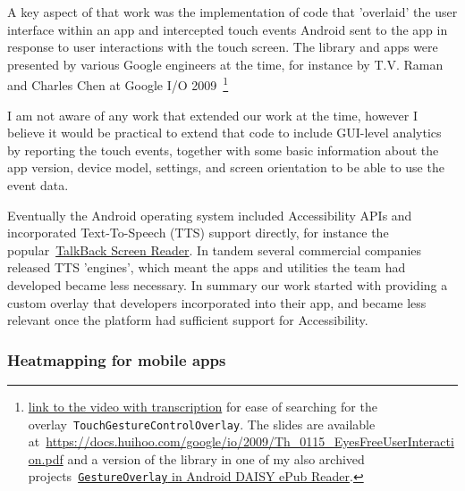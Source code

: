 A key aspect of that work was the implementation of code that 'overlaid' the user interface within an app and intercepted touch events Android sent to the app in response to user interactions with the touch screen. The library and apps were presented by various Google engineers at the time, for instance by T.V. Raman and Charles Chen at Google I/O 2009~\footnote{ \href{http://transcriptvids.com/v/xS-ju61vOQw.html}{link to the video with transcription} for ease of searching for the overlay~\texttt{TouchGestureControlOverlay}. The slides are available at~\url{https://docs.huihoo.com/google/io/2009/Th_0115_EyesFreeUserInteraction.pdf} and a version of the library in one of my also archived projects~\href{https://github.com/julianharty/android-daisy-epub-reader/blob/master/src/com/google/marvin/widget/GestureOverlay.java}{\texttt{GestureOverlay} in Android DAISY ePub Reader}.} 

I am not aware of any work that extended our work at the time, however I believe it would be practical to extend that code to include GUI-level analytics by reporting the touch events, together with some basic information about the app version, device model, settings, and screen orientation to be able to use the event data.

Eventually the Android operating system included Accessibility APIs and incorporated Text-To-Speech (TTS) support directly, for instance the popular~\href{https://support.google.com/accessibility/android/answer/6283677?hl=en}{TalkBack Screen Reader}. In tandem several commercial companies released TTS 'engines', which meant the apps and utilities the team had developed became less necessary. In summary our work started with providing a custom overlay that developers incorporated into their app, and became less relevant once the platform had sufficient support for Accessibility.


\subsubsection{Heatmapping for mobile apps}

